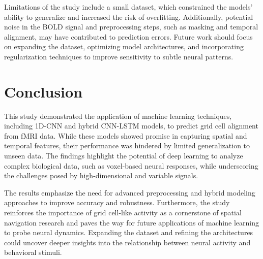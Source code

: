 \documentclass[a4paper]{article}
\begin{document}
Limitations of the study include a small dataset, which constrained the models' ability to generalize and increased the risk of overfitting. Additionally, potential noise in the BOLD signal and preprocessing steps, such as masking and temporal alignment, may have contributed to prediction errors. Future work should focus on expanding the dataset, optimizing model architectures, and incorporating regularization techniques to improve sensitivity to subtle neural patterns.

\section{Conclusion}
\label{sec:conclusion}

\noindent This study demonstrated the application of machine learning techniques, including 1D-CNN and hybrid CNN-LSTM models, to predict grid cell alignment from fMRI data. While these models showed promise in capturing spatial and temporal features, their performance was hindered by limited generalization to unseen data. The findings highlight the potential of deep learning to analyze complex biological data, such as voxel-based neural responses, while underscoring the challenges posed by high-dimensional and variable signals.

The results emphasize the need for advanced preprocessing and hybrid modeling approaches to improve accuracy and robustness. Furthermore, the study reinforces the importance of grid cell-like activity as a cornerstone of spatial navigation research and paves the way for future applications of machine learning to probe neural dynamics. Expanding the dataset and refining the architectures could uncover deeper insights into the relationship between neural activity and behavioral stimuli.


\printbibliography[heading=bibintoc, title={References}]
\end{document}
